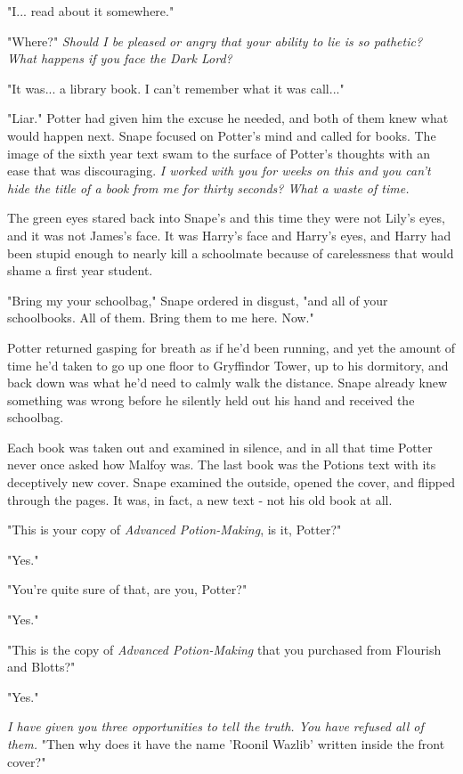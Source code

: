 \documentclass[a4paper,11pt]{article}
\begin{document}
"I... read about it somewhere."

"Where?" \emph{Should I be pleased or angry that your ability to lie is so pathetic? What happens if you face the Dark Lord?}

"It was... a library book. I can't remember what it was call..."

"Liar." Potter had given him the excuse he needed, and both of them knew what would happen next. Snape focused on Potter's mind and called for books. The image of the sixth year text swam to the surface of Potter's thoughts with an ease that was discouraging. \emph{I worked with you for weeks on this and you can't hide the title of a book from me for thirty seconds? What a waste of time.}

The green eyes stared back into Snape's and this time they were not Lily's eyes, and it was not James's face. It was Harry's face and Harry's eyes, and Harry had been stupid enough to nearly kill a schoolmate because of carelessness that would shame a first year student.

"Bring my your schoolbag," Snape ordered in disgust, "and all of your schoolbooks. All of them. Bring them to me here. Now."

Potter returned gasping for breath as if he'd been running, and yet the amount of time he'd taken to go up one floor to Gryffindor Tower, up to his dormitory, and back down was what he'd need to calmly walk the distance. Snape already knew something was wrong before he silently held out his hand and received the schoolbag.

Each book was taken out and examined in silence, and in all that time Potter never once asked how Malfoy was. The last book was the Potions text with its deceptively new cover. Snape examined the outside, opened the cover, and flipped through the pages. It was, in fact, a new text - not his old book at all.

"This is your copy of \emph{Advanced Potion-Making}, is it, Potter?"

"Yes."

"You're quite sure of that, are you, Potter?"

"Yes."

"This is the copy of \emph{Advanced Potion-Making} that you purchased from Flourish and Blotts?"

"Yes."

\emph{I have given you three opportunities to tell the truth. You have refused all of them.} "Then why does it have the name 'Roonil Wazlib' written inside the front cover?"
\end{document}
